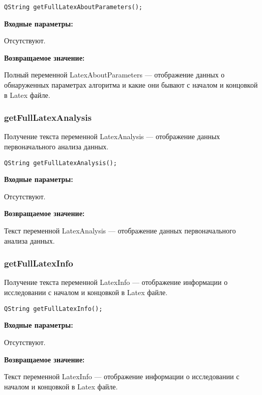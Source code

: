 \documentclass[a4paper,12pt]{article}
\begin{document}
\begin{lstlisting}[label=code_syntax_getFullLatexAboutParameters,caption=Синтаксис]
QString getFullLatexAboutParameters();
\end{lstlisting}

\textbf{Входные параметры:}

Отсутствуют.

\textbf{Возвращаемое значение:}

Полный переменной LatexAboutParameters --- отображение данных о обнаруженных параметрах алгоритма и какие они бывают с началом и концовкой в Latex файле.


\subsubsection{getFullLatexAnalysis}\label{getFullLatexAnalysis}

Получение текста переменной LatexAnalysis --- отображение данных первоначального анализа данных.


\begin{lstlisting}[label=code_syntax_getFullLatexAnalysis,caption=Синтаксис]
QString getFullLatexAnalysis();
\end{lstlisting}

\textbf{Входные параметры:}

Отсутствуют.

\textbf{Возвращаемое значение:}

Текст переменной LatexAnalysis --- отображение данных первоначального анализа данных.


\subsubsection{getFullLatexInfo}\label{getFullLatexInfo}

Получение текста переменной LatexInfo --- отображение информации о исследовании с началом и концовкой в Latex файле.


\begin{lstlisting}[label=code_syntax_getFullLatexInfo,caption=Синтаксис]
QString getFullLatexInfo();
\end{lstlisting}

\textbf{Входные параметры:}

Отсутствуют.

\textbf{Возвращаемое значение:}

Текст переменной LatexInfo --- отображение информации о исследовании с началом и концовкой в Latex файле.
\end{document}
